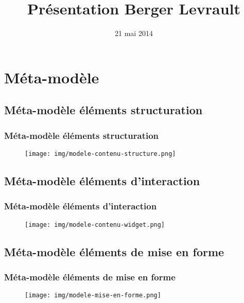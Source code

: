 \documentclass[]{beamer}
\begin{document}
\title[]{Présentation Berger Levrault}
\subtitle[\ldots]{}
\date{21 mai 2014}
\begin{frame}
\titlepage
\end{frame}




\section{Méta-modèle}
\begin{frame}
\tableofcontents[currentsection]
\end{frame}
\subsection{Méta-modèle éléments structuration}
\begin{frame}
\frametitle{Méta-modèle éléments structuration}
\begin{figure}
\centering
\texttt{[image: img/modele-contenu-structure.png]}
\end{figure}
\end{frame}

\subsection{Méta-modèle éléments d'interaction}
\begin{frame}
\frametitle{Méta-modèle éléments d'interaction}
\begin{figure}
\centering
\texttt{[image: img/modele-contenu-widget.png]}
\end{figure}
\end{frame}

\subsection{Méta-modèle éléments de mise en forme}
\begin{frame}
\frametitle{Méta-modèle éléments de mise en forme}
\begin{figure}
\centering
\texttt{[image: img/modele-mise-en-forme.png]}
\end{figure}
\end{frame}
\end{document}
